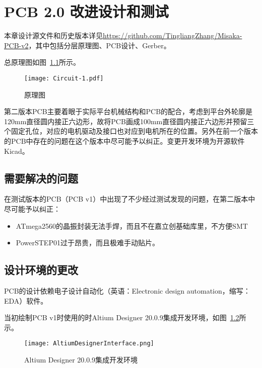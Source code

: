 \chapter{PCB 2.0 改进设计和测试}
\label{cha:PCB-v2}

本章设计源文件和历史版本详见\url{https://github.com/TingliangZhang/Misaka-PCB-v2}，其中包括分层原理图、PCB设计、Gerber。

总原理图如图~\ref{fig:Circuit-1}所示。

\begin{figure}[htbp]
    \centering
    \texttt{[image: Circuit-1.pdf]}
    \caption{原理图}
    \label{fig:Circuit-1}
\end{figure}

第二版本PCB主要着眼于实际平台机械结构和PCB的配合，考虑到平台外轮廓是120mm直径圆内接正六边形，故将PCB画成100mm直径圆内接正六边形并预留三个固定孔位，对应的电机驱动及接口也对应到电机所在的位置。另外在前一个版本的PCB中存在的问题在这个版本中尽可能予以纠正。变更开发环境为开源软件Kicad。

\section{需要解决的问题}

在测试版本的PCB（PCB v1）中出现了不少经过测试发现的问题，在第二版本中尽可能予以纠正：

\begin{itemize}
    \item ATmega2560的晶振封装无法手焊，而且不在嘉立创基础库里，不方便SMT
    \item PowerSTEP01过于昂贵，而且极难手动贴片。
\end{itemize}

\section{设计环境的更改}

PCB的设计依赖电子设计自动化（英语：Electronic design automation，缩写：EDA）软件。

当初绘制PCB v1时使用的时Altium Designer 20.0.9集成开发环境，如图~\ref{fig:AltiumDesignerInterface}所示。

\begin{figure}[htbp]
    \centering
    \texttt{[image: AltiumDesignerInterface.png]}
    \caption{Altium Designer 20.0.9集成开发环境}
    \label{fig:AltiumDesignerInterface}
\end{figure}

